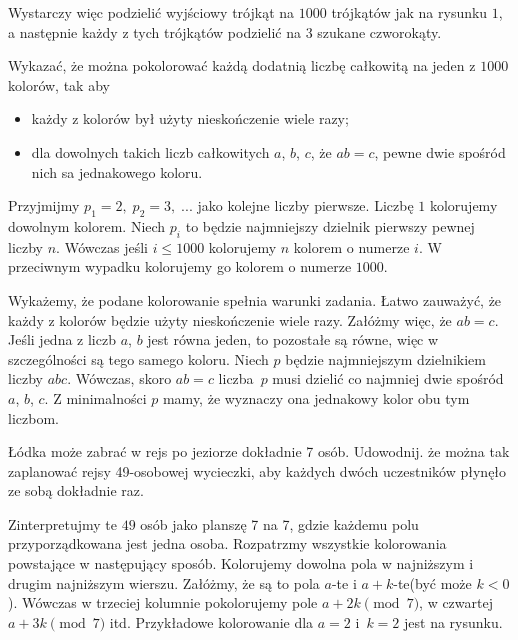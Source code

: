 \noindent
Wystarczy więc podzielić wyjściowy trójkąt na $1000$ trójkątów jak na rysunku $1$, a następnie każdy z tych trójkątów podzielić na $3$ szukane czworokąty.

\vspace{10px}

\begin{problem}{4} 
	Wykazać, że można pokolorować każdą dodatnią liczbę całkowitą na jeden z $1000$ kolorów, tak aby
	\begin{itemize}
		\item każdy z kolorów był użyty nieskończenie wiele razy;
		\item dla dowolnych takich liczb całkowitych $a$, $b$, $c$, że $ab = c$, pewne dwie spośród nich sa jednakowego koloru.
	\end{itemize} 
\end{problem}

\vspace{5px}

\noindent
Przyjmijmy $p_1 = 2,\; p_2 = 3, \; ...$ jako kolejne liczby pierwsze. Liczbę $1$ kolorujemy dowolnym kolorem. Niech $p_i$ to będzie najmniejszy dzielnik pierwszy pewnej liczby $n$. Wówczas jeśli $i \leqslant 1000$ kolorujemy $n$ kolorem o numerze $i$. W przeciwnym wypadku kolorujemy go kolorem o numerze $1000$.

\vspace{5px}

\noindent
Wykażemy, że podane kolorowanie spełnia warunki zadania. Łatwo zauważyć, że każdy z kolorów będzie użyty nieskończenie wiele razy. Załóżmy więc, że $ab = c$. Jeśli jedna z liczb $a$, $b$ jest równa jeden, to pozostałe są równe, więc w szczególności są tego samego koloru. Niech $p$ będzie najmniejszym dzielnikiem liczby $abc$. Wówczas, skoro $ab = c$ liczba~$p$ musi dzielić co najmniej dwie spośród $a$, $b$, $c$. Z minimalności $p$ mamy, że wyznaczy ona jednakowy kolor obu tym liczbom.

\vspace{10px}

\begin{problem}{5}
	Łódka może zabrać w rejs po jeziorze dokładnie 7 osób. Udowodnij. że można tak zaplanować rejsy 49-osobowej wycieczki, aby każdych dwóch uczestników płynęło ze sobą dokładnie raz.
\end{problem}

\noindent
Zinterpretujmy te $49$ osób jako planszę 7 na 7, gdzie każdemu polu przyporządkowana jest jedna osoba. Rozpatrzmy wszystkie kolorowania powstające w następujący sposób. Kolorujemy dowolna pola w najniższym i drugim najniższym wierszu. Załóżmy, że są to pola $a$-te i $a + k$-te(być może $k < 0$). Wówczas w trzeciej kolumnie pokolorujemy pole $a + 2k \pmod{7}$, w czwartej $a + 3k \pmod{7}$ itd. Przykładowe kolorowanie dla $a = 2$ i~$k = 2$ jest na rysunku.


